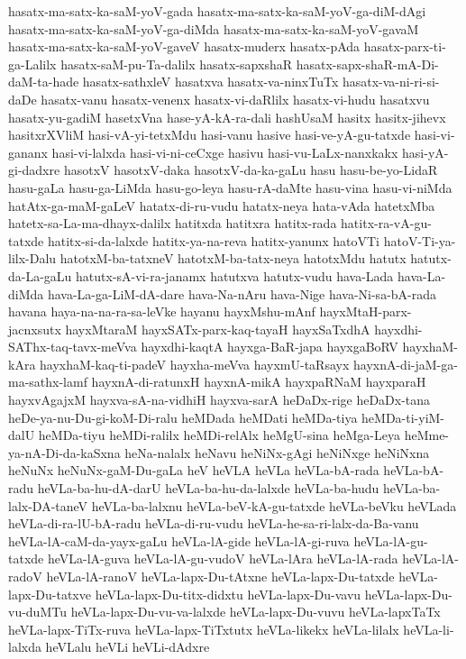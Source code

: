 {hasatx-ma-satx-ka-saM-yoV-gada
hasatx-ma-satx-ka-saM-yoV-ga-diM-dAgi
hasatx-ma-satx-ka-saM-yoV-ga-diMda
hasatx-ma-satx-ka-saM-yoV-gavaM
hasatx-ma-satx-ka-saM-yoV-gaveV
hasatx-muderx
hasatx-pAda
hasatx-parx-ti-ga-Lalilx
hasatx-saM-pu-Ta-dalilx
hasatx-sapxshaR
hasatx-sapx-shaR-mA-Di-daM-ta-hade
hasatx-sathxleV
hasatxva
hasatx-va-ninxTuTx
hasatx-va-ni-ri-si-daDe
hasatx-vanu
hasatx-venenx
hasatx-vi-daRlilx
hasatx-vi-hudu
hasatxvu
hasatx-yu-gadiM
hasetxVna
hase-yA-kA-ra-dali
hashUsaM
hasitx
hasitx-jihevx
hasitxrXVliM
hasi-vA-yi-tetxMdu
hasi-vanu
hasive
hasi-ve-yA-gu-tatxde
hasi-vi-gananx
hasi-vi-lalxda
hasi-vi-ni-ceCxge
hasivu
hasi-vu-LaLx-nanxkakx
hasi-yA-gi-dadxre
hasotxV
hasotxV-daka
hasotxV-da-ka-gaLu
hasu
hasu-be-yo-LidaR
hasu-gaLa
hasu-ga-LiMda
hasu-go-leya
hasu-rA-daMte
hasu-vina
hasu-vi-niMda
hatAtx-ga-maM-gaLeV
hatatx-di-ru-vudu
hatatx-neya
hata-vAda
hatetxMba
hatetx-sa-La-ma-dhayx-dalilx
hatitxda
hatitxra
hatitx-rada
hatitx-ra-vA-gu-tatxde
hatitx-si-da-lalxde
hatitx-ya-na-reva
hatitx-yanunx
hatoVTi
hatoV-Ti-ya-lilx-Dalu
hatotxM-ba-tatxneV
hatotxM-ba-tatx-neya
hatotxMdu
hatutx
hatutx-da-La-gaLu
hatutx-sA-vi-ra-janamx
hatutxva
hatutx-vudu
hava-Lada
hava-La-diMda
hava-La-ga-LiM-dA-dare
hava-Na-nAru
hava-Nige
hava-Ni-sa-bA-rada
havana
haya-na-na-ra-sa-leVke
hayanu
hayxMshu-mAnf
hayxMtaH-parx-jacnxsutx
hayxMtaraM
hayxSATx-parx-kaq-tayaH
hayxSaTxdhA
hayxdhi-SAThx-taq-tavx-meVva
hayxdhi-kaqtA
hayxga-BaR-japa
hayxgaBoRV
hayxhaM-kAra
hayxhaM-kaq-ti-padeV
hayxha-meVva
hayxmU-taRsayx
hayxnA-di-jaM-ga-ma-sathx-lamf
hayxnA-di-ratunxH
hayxnA-mikA
hayxpaRNaM
hayxparaH
hayxvAgajxM
hayxva-sA-na-vidhiH
hayxva-sarA
heDaDx-rige
heDaDx-tana
heDe-ya-nu-Du-gi-koM-Di-ralu
heMDada
heMDati
heMDa-tiya
heMDa-ti-yiM-dalU
heMDa-tiyu
heMDi-ralilx
heMDi-relAlx
heMgU-sina
heMga-Leya
heMme-ya-nA-Di-da-kaSxna
heNa-nalalx
heNavu
heNiNx-gAgi
heNiNxge
heNiNxna
heNuNx
heNuNx-gaM-Du-gaLa
heV
heVLA
heVLa
heVLa-bA-rada
heVLa-bA-radu
heVLa-ba-hu-dA-darU
heVLa-ba-hu-da-lalxde
heVLa-ba-hudu
heVLa-ba-lalx-DA-taneV
heVLa-ba-lalxnu
heVLa-beV-kA-gu-tatxde
heVLa-beVku
heVLada
heVLa-di-ra-lU-bA-radu
heVLa-di-ru-vudu
heVLa-he-sa-ri-lalx-da-Ba-vanu
heVLa-lA-caM-da-yayx-gaLu
heVLa-lA-gide
heVLa-lA-gi-ruva
heVLa-lA-gu-tatxde
heVLa-lA-guva
heVLa-lA-gu-vudoV
heVLa-lAra
heVLa-lA-rada
heVLa-lA-radoV
heVLa-lA-ranoV
heVLa-lapx-Du-tAtxne
heVLa-lapx-Du-tatxde
heVLa-lapx-Du-tatxve
heVLa-lapx-Du-titx-didxtu
heVLa-lapx-Du-vavu
heVLa-lapx-Du-vu-duMTu
heVLa-lapx-Du-vu-va-lalxde
heVLa-lapx-Du-vuvu
heVLa-lapxTaTx
heVLa-lapx-TiTx-ruva
heVLa-lapx-TiTxtutx
heVLa-likekx
heVLa-lilalx
heVLa-li-lalxda
heVLalu
heVLi
heVLi-dAdxre
}
